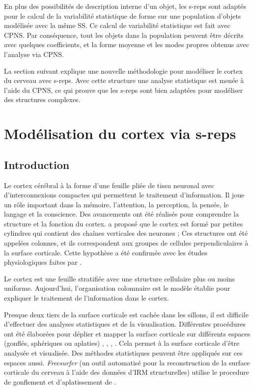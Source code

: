 En plus des possibilités de description interne d'un objet,
les s-reps sont adaptés pour le calcul de la variabilité statistique de forme 
sur une population d'objets modélisée avec la même SS.
Ce calcul de variabilité statistique est fait avec CPNS.
Par conséquence, tout les objets dans la population 
peuvent être décrits avec quelques coefficients, et la forme moyenne 
et les modes propres obtenus avec l'analyse via CPNS.

La section suivant explique une nouvelle méthodologie pour
modéliser le cortex du cerveau avec s-reps.
Avec cette structure une analyse statistique est menée à l'aide du CPNS,
ce qui prouve que les s-reps sont bien adaptées pour modéliser des
structures complexes.

\section{Modélisation du cortex via s-reps}
\label{sec:cortexModelingfr}

\subsection{Introduction}
\label{sec:introductionfr}

Le cortex cérébral à la forme d'une feuille pliée de tissu neuronal
avec d'interconnexions compactes qui permettent le traitement d'information.
Il joue un rôle important dans la mémoire, l'attention, la perception, la pensée, le langage et la conscience.
Des avancements ont été réalisés pour comprendre la structure et la fonction du cortex.
\cite{lorente1934studies} a proposé que le cortex est formé par petites cylindres qui contient des chaînes verticales des neurones ;
Ces structures ont été appelées colonnes, et ils correspondent 
aux groupes de cellules perpendiculaires à la surface corticale.
Cette hypothèse a été confirmée avec les études physiologiques faites par \cite{mountcastle1998perceptual}.

Le cortex est une feuille stratifiée avec une structure cellulaire plus ou moins uniforme.
Aujourd'hui, l'organisation colomnaire est le modèle établie pour expliquer le traitement 
de l'information dans le cortex.

Presque deux tiers de la surface corticale est cachée dans les sillons, il est difficile d'effectuer des analyses statistiques et de la visualisation.
Différentes procédures ont été élaborées pour déplier et mapper la surface corticale sur différents espaces (gonflés, sphériques ou aplaties)
\cite{drury_computerized_1996}, \cite{hermosillo_unfolding_1999}, \cite{fischl_cortical_1999}, \cite{pons_area_2004}.
Cela permet à la surface corticale d'être analysée et visualisée. Des méthodes statistiques 
peuvent être appliqués sur ces espaces aussi.
\textit{Freesurfer} (un outil automatisé pour la reconstruction de la surface corticale du cerveau à l'aide des données d'IRM structurelles)
utilise le procedure de gonflement et d'aplatissement de \cite{fischl_cortical_1999}.

